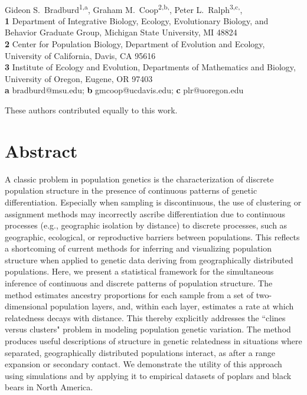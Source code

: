 \documentclass[10pt,letterpaper]{article}
\date{}
\begin{document}
\vspace*{0.2in}

\begin{flushleft}
{\Large
\textbf{}
}
\newline
\\
Gideon S.\  Bradburd\textsuperscript{1,a},
Graham M.\  Coop\textsuperscript{2,b,\Yinyang},
Peter L.\  Ralph\textsuperscript{3,c,\Yinyang},
\\
\bigskip
\textbf{1}
Department of Integrative Biology, 
Ecology, Evolutionary Biology, and Behavior Graduate Group,
Michigan State University, MI 48824
\\
\textbf{2}
Center for Population Biology,
Department of Evolution and Ecology, 
University of California, Davis, CA 95616
\\
\textbf{3} 
Institute of Ecology and Evolution,
Departments of Mathematics and Biology,
University of Oregon, Eugene, OR 97403
\\
\textbf{a} bradburd@msu.edu; 
\textbf{b} gmcoop@ucdavis.edu;
\textbf{c} plr@uoregon.edu

\bigskip

%
\Yinyang These authors contributed equally to this work.

\end{flushleft}
\section*{Abstract}

A classic problem in population genetics is the characterization 
of discrete population structure in the presence of 
continuous patterns of genetic differentiation.
Especially when sampling is discontinuous, 
the use of clustering or assignment methods may incorrectly ascribe
differentiation due to continuous processes (e.g., geographic isolation by distance)
to discrete processes, such as geographic, ecological, or reproductive barriers 
between populations.
This reflects a shortcoming of current methods for inferring and 
visualizing population structure when applied to genetic data
deriving from geographically distributed populations.
Here, we present a statistical framework for the simultaneous inference 
of continuous and discrete patterns of population structure.
The method estimates ancestry proportions for each 
sample from a set of two-dimensional population layers, 
and, within each layer, estimates a rate at which relatedness decays with distance.
This thereby explicitly addresses the ``clines versus clusters" problem in 
modeling population genetic variation.
The method produces useful descriptions of structure in genetic relatedness
in situations where separated, geographically distributed populations interact,
as after a range expansion or secondary contact.
We demonstrate the utility of this approach using simulations 
and by applying it to empirical datasets of poplars and black bears in North America.
\end{document}
